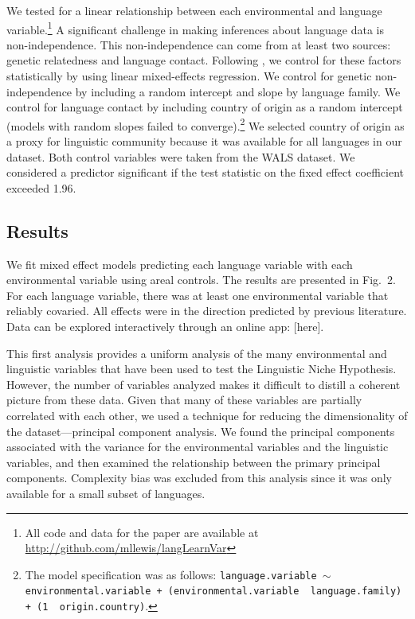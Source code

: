 \documentclass[10pt,letterpaper]{article}
\begin{document}
We  tested for a linear relationship between each environmental and language variable.\footnote{All code and data for the paper are available at \url{http://github.com/mllewis/langLearnVar}}  A significant challenge in making inferences about language data is non-independence. This non-independence can come from at least two sources: genetic relatedness and language contact. Following , we control for these factors statistically by using linear mixed-effects regression. We control for genetic non-independence by including a random intercept and slope by language family. We control for language contact by including country of origin as a random intercept (models with random slopes failed to converge).\footnote{The model specification was as follows:  \texttt{language.variable $\sim$ environmental.variable + (environmental.variable~\textbar~language.family) +  (1~\textbar~origin.country)}.}  We selected country of origin as a proxy for linguistic community because it was available for all languages in our dataset. Both control variables were taken from the WALS dataset. We considered a predictor significant if the test statistic on the fixed effect coefficient exceeded 1.96. 

\subsection{Results}
We fit mixed effect models predicting each language variable with each environmental variable using areal controls. The results are presented in Fig.\ 2. For each language variable, there was at least one environmental variable that reliably covaried. All effects were in the direction predicted by previous literature. Data can be explored interactively through an online app: [here].

This first analysis provides a uniform analysis of the many environmental and linguistic variables that have been used to test the Linguistic Niche Hypothesis. However,  the number of variables analyzed makes it difficult to distill a coherent picture from these data. Given that many of these variables  are partially correlated with each other, we used a technique for reducing the dimensionality of the dataset---principal component analysis. We found the principal components associated with the variance for the environmental variables and the linguistic variables, and then examined the relationship between the primary principal components. Complexity bias was excluded from this analysis since it was only available for a small subset of languages.
\end{document}
